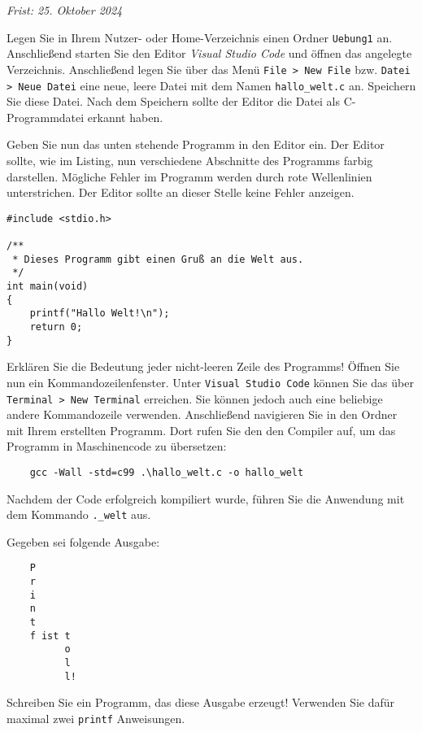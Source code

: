 \documentclass[fontsize=11pt, parskip=half]{scrartcl}
\begin{document}
 
{\raggedleft\textit{Frist: 25. Oktober 2024}\\}

%
\subtask{}
Legen Sie in Ihrem Nutzer- oder Home-Verzeichnis einen Ordner \texttt{Uebung1} an. Anschließend starten Sie den Editor \textit{Visual Studio Code} und öffnen das angelegte Verzeichnis. Anschließend legen Sie über das Menü \texttt{File > New File} bzw. \texttt{Datei > Neue Datei} eine neue, leere Datei mit dem Namen \texttt{hallo\_welt.c} an. Speichern Sie diese Datei. Nach dem Speichern sollte der Editor die Datei als C-Programmdatei erkannt haben.

\subtask{}
Geben Sie nun das unten stehende Programm in den Editor ein. Der Editor sollte, wie im Listing, nun verschiedene Abschnitte des Programms farbig darstellen. Mögliche Fehler im Programm werden durch rote Wellenlinien unterstrichen. Der Editor sollte an dieser Stelle keine Fehler anzeigen. 
\begin{verbatim}
#include <stdio.h>

/**
 * Dieses Programm gibt einen Gruß an die Welt aus.
 */
int main(void)
{
    printf("Hallo Welt!\n");
    return 0;
}
\end{verbatim}
 
\subtask{}
Erklären Sie die Bedeutung jeder nicht-leeren Zeile des Programms!
%
\subtask{}
Öffnen Sie nun ein Kommandozeilenfenster. Unter \texttt{Visual Studio Code} können Sie das über \texttt{Terminal > New Terminal} erreichen. Sie können jedoch auch eine beliebige andere Kommandozeile verwenden. Anschließend navigieren Sie in den Ordner mit Ihrem erstellten Programm. Dort rufen Sie den den Compiler auf, um das Programm in Maschinencode zu übersetzen:
%
\begin{verbatim}
    gcc -Wall -std=c99 .\hallo_welt.c -o hallo_welt 
\end{verbatim}
%
Nachdem der Code erfolgreich kompiliert wurde, führen Sie die Anwendung mit dem Kommando \texttt{.\hallo_welt} aus.

Gegeben sei folgende Ausgabe:
\begin{verbatim}
    P
    r
    i
    n
    t
    f ist t
          o
          l
          l!
\end{verbatim}
Schreiben Sie ein Programm, das diese Ausgabe erzeugt! Verwenden Sie dafür maximal zwei \texttt{printf} Anweisungen.
\end{document}
